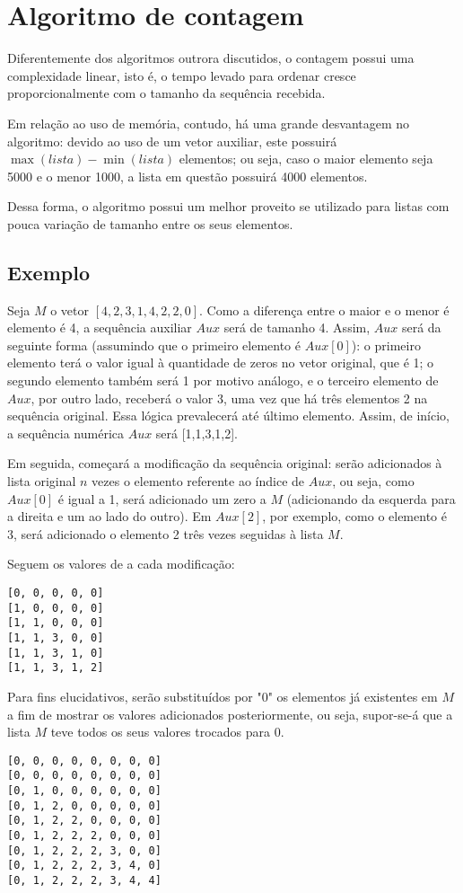 \section{Algoritmo de contagem}
Diferentemente dos algoritmos outrora discutidos, o contagem possui uma complexidade linear, isto é, o tempo levado para ordenar cresce proporcionalmente com o tamanho da sequência recebida. 

Em relação ao uso de memória, contudo, há uma grande desvantagem no algoritmo: devido ao uso de um vetor auxiliar, este possuirá $\max({lista})-\min({lista}) $ elementos; ou seja, caso o maior elemento seja 5000 e o menor 1000, a lista em questão possuirá 4000 elementos.

Dessa forma, o algoritmo possui um melhor proveito se utilizado para listas com pouca variação de tamanho entre os seus elementos.

\subsection{Exemplo}
Seja $M$ o vetor $[4,2,3,1,4,2,2,0]$. Como a diferença entre o maior e o menor é elemento é 4, a sequência auxiliar $Aux$ será de tamanho 4.
Assim, $Aux$ será da seguinte forma (assumindo que o primeiro elemento é $Aux[0]$): o primeiro elemento terá o valor igual à quantidade de zeros no vetor original, que é 1; o segundo elemento também será 1 por motivo análogo, e o terceiro elemento de $Aux$, por outro lado, receberá o valor 3, uma vez que há três elementos 2 na sequência original. Essa lógica prevalecerá até último elemento.
Assim, de início, a sequência numérica $Aux$ será [1,1,3,1,2].

Em seguida, começará a modificação da sequência original: serão adicionados à lista original $n$ vezes o elemento referente ao índice de $Aux$, ou seja, como $Aux[0]$ é igual a 1, será adicionado um zero a $M$ (adicionando da esquerda para a direita e um ao lado do outro). Em $Aux[2]$, por exemplo, como o elemento é 3, será adicionado o elemento 2 três vezes seguidas à lista $M$.

Seguem os valores de  a cada modificação:
\begin{lstlisting}
[0, 0, 0, 0, 0]
[1, 0, 0, 0, 0]
[1, 1, 0, 0, 0]
[1, 1, 3, 0, 0]
[1, 1, 3, 1, 0]
[1, 1, 3, 1, 2]
\end{lstlisting}
\newpage
Para fins elucidativos, serão substituídos por "0" os elementos já existentes em $M$ a fim de mostrar os valores adicionados posteriormente, ou seja, supor-se-á que a lista $M$ teve todos os seus valores trocados para 0.
\begin{lstlisting}
[0, 0, 0, 0, 0, 0, 0, 0]
[0, 0, 0, 0, 0, 0, 0, 0]
[0, 1, 0, 0, 0, 0, 0, 0]
[0, 1, 2, 0, 0, 0, 0, 0]
[0, 1, 2, 2, 0, 0, 0, 0]
[0, 1, 2, 2, 2, 0, 0, 0]
[0, 1, 2, 2, 2, 3, 0, 0]
[0, 1, 2, 2, 2, 3, 4, 0]
[0, 1, 2, 2, 2, 3, 4, 4] 
\end{lstlisting}

